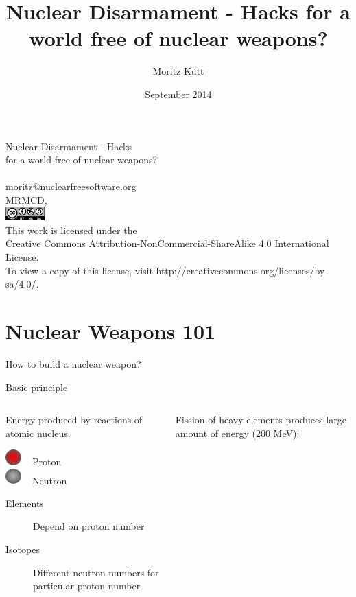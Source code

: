 \documentclass[presentation]{beamer}
\author{Moritz Kütt}
\date{September 2014}
\title{Nuclear Disarmament - Hacks for a world free of nuclear weapons?}
\makeatletter
\renewcommand{\maketitle}{\begin{frame}\begin{center}\Large
\vspace{1.5cm}
Nuclear Disarmament - Hacks\\ for a world free of nuclear weapons?\\[0.5em]\small\insertauthor\\[1em]\tiny moritz@nuclearfreesoftware.org\\[1em]
MRMCD, \insertdate\\[0.5em]
\vspace{1.8cm} \includegraphics[width=1.5cm]{by-nc-sa_eu.png}\\\fontsize{5pt}{6}\selectfont \textcolor{gray!85}{This work is licensed under the\\ Creative Commons Attribution-NonCommercial-ShareAlike 4.0 International License.\\ To view a copy of this license, visit http://creativecommons.org/licenses/by-sa/4.0/.}
\end{center}\end{frame}}
\def\s@out@end{\relax\relax\relax}
\def\s@out#1\s@out@end{\sout{#1}}
\def\makestrikeout<#1>#2{\only<#1>{\s@out}#2\s@out@end}
\makeatother
\begin{document}
\maketitle

\section{Nuclear Weapons 101}
\label{sec-1}
\begin{frame}[label=sec-1-1]{}
\begin{center}
\makestrikeout<2>{How to build a nuclear weapon?\\[1em]}
\end{center}
\end{frame}

\begin{frame}[label=sec-1-2]{Basic principle}
\begin{columns}
\begin{column}{0.45\textwidth}
Energy produced by reactions of atomic nucleus.

\begin{varblock}[\textwidth]{}
\includegraphics[width=0.1\textwidth]{images/proton} ~ Proton \\[0.5em]
\includegraphics[width=0.1\textwidth]{images/neutron} ~ Neutron
\end{varblock}

\footnotesize

\begin{description}
\item[{Elements}] Depend on proton number
\item[{Isotopes}] Different neutron numbers for particular proton number
\end{description}
\end{column}

\begin{column}{0.45\textwidth}

Fission of heavy elements produces large amount of energy (200 MeV):


\end{column}
\end{columns}
\end{frame}
\end{document}
